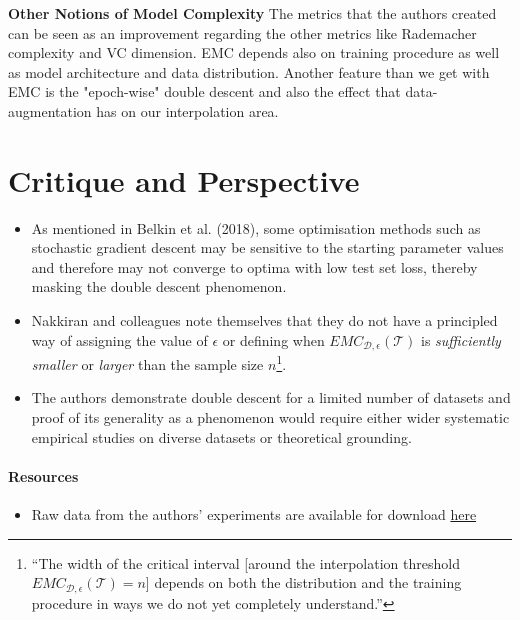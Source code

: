 \documentclass[]{article}
\providecommand{\tightlist}{%
  \setlength{\itemsep}{0pt}\setlength{\parskip}{0pt}}
\let\oldparagraph\paragraph
\renewcommand{\paragraph}[1]{\oldparagraph{#1}\mbox{}}
\begin{document}
\textbf{Other Notions of Model Complexity} The metrics that the authors created can be seen as an improvement regarding the other metrics like Rademacher complexity and VC dimension. EMC depends also on training procedure as well as model architecture and data distribution. Another feature than we get with EMC is the "epoch-wise" double descent and also the effect that data-augmentation has on our interpolation area. \\

\section{Critique and Perspective}

\begin{itemize}
\tightlist
\item
  As mentioned in Belkin et al. (2018), some optimisation methods such
  as stochastic gradient descent may be sensitive to the starting
  parameter values and therefore may not converge to optima with low
  test set loss, thereby masking the double descent phenomenon.\\ 
\item
  Nakkiran and colleagues note themselves that they do not have a
  principled way of assigning the value of \(\epsilon\) or defining when
  \(EMC_{\mathcal{D}, \epsilon}(\mathcal{T})\) is \emph{sufficiently
  smaller} or \emph{larger} than the sample size \(n\)\footnote{``The
    width of the critical interval {[}around the interpolation threshold
    \(EMC_{\mathcal{D}, \epsilon}(\mathcal{T}) = n\){]} depends on both
    the distribution and the training procedure in ways we do not yet
    completely understand.''}.\\
\item
  The authors demonstrate double descent for a limited number of
  datasets and proof of its generality as a phenomenon would require
  either wider systematic empirical studies on diverse datasets or
  theoretical grounding.
\end{itemize}

\hypertarget{resources}{%
\paragraph{Resources}\label{resources}}

\begin{itemize}
\tightlist
\item
  Raw data from the authors' experiments are available for download
  \href{https://gitlab.com/harvard-machine-learning/double-descent/tree/master}{here}
\end{itemize}
\end{document}

